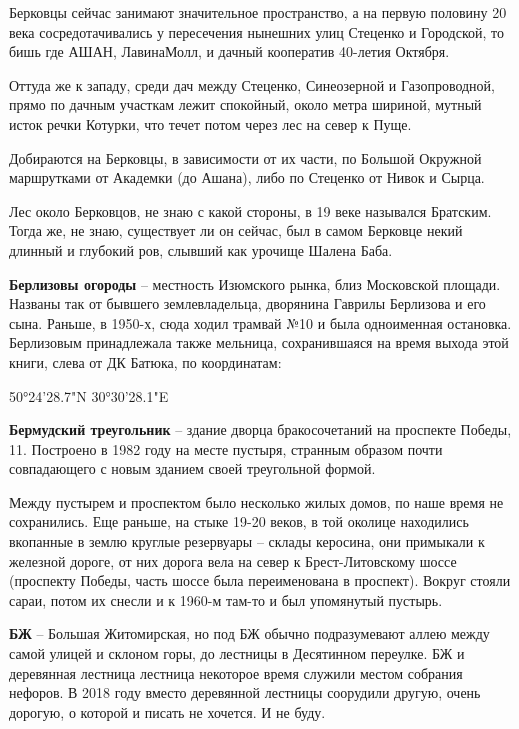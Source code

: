 Берковцы сейчас занимают значительное пространство, а на первую половину 20 века сосредотачивались у пересечения нынешних улиц Стеценко и Городской, то бишь где АШАН, ЛавинаМолл, и дачный кооператив 40-летия Октября. 

Оттуда же к западу, среди дач между Стеценко, Синеозерной и Газопроводной, прямо по дачным участкам лежит спокойный, около метра шириной, мутный исток речки Котурки, что течет потом через лес на север к Пуще.

Добираются на Берковцы, в зависимости от их части, по Большой Окружной маршрутками от Академки (до Ашана), либо по Стеценко от Нивок и Сырца.

Лес около Берковцов, не знаю с какой стороны, в 19 веке назывался Братским. Тогда же, не знаю, существует ли он сейчас, был в самом Берковце некий длинный и глубокий ров, слывший как урочище Шалена Баба.\\

\medskip


\textbf{Берлизовы огороды} – местность Изюмского рынка, близ Московской площади. Названы так от бывшего землевладельца, дворянина Гаврилы Берлизова и его сына. Раньше, в 1950-х, сюда ходил трамвай №10 и была одноименная остановка. Берлизовым принадлежала также мельница, сохранившаяся на время выхода этой книги, слева от ДК Батюка, по координатам:

50°24'28.7"N 30°30'28.1"E\\

\medskip

\textbf{Бермудский треугольник} – здание дворца бракосочетаний на проспекте Победы, 11. Построено в 1982 году на месте пустыря, странным образом почти совпадающего с новым зданием своей треугольной формой.

Между пустырем и проспектом было несколько жилых домов, по наше время не сохранились. Еще раньше, на стыке 19-20 веков, в той околице находились вкопанные в землю круглые резервуары – склады керосина, они примыкали к железной дороге, от них дорога вела на север к Брест-Литовскому шоссе (проспекту Победы, часть шоссе была переименована в проспект). Вокруг стояли сараи, потом их снесли и к 1960-м там-то и был упомянутый пустырь.\\

\medskip

\textbf{БЖ} – Большая Житомирская, но под БЖ обычно подразумевают аллею между самой улицей и склоном горы, до лестницы в Десятинном переулке. БЖ и деревянная лестница лестница некоторое время служили местом собрания нефоров. В 2018 году вместо деревянной лестницы соорудили другую, очень дорогую, о которой и писать не хочется. И не буду.\\


